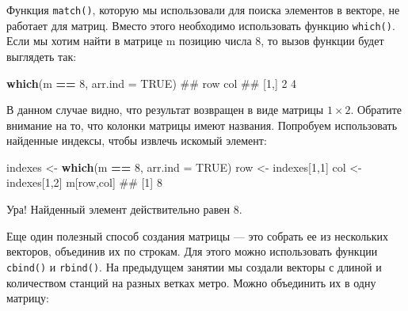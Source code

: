 \documentclass[]{book}
\newenvironment{Shaded}{\begin{snugshade}}{\end{snugshade}}
\newcommand{\KeywordTok}[1]{\textcolor[rgb]{0.13,0.29,0.53}{\textbf{#1}}}
\newcommand{\DataTypeTok}[1]{\textcolor[rgb]{0.13,0.29,0.53}{#1}}
\newcommand{\DecValTok}[1]{\textcolor[rgb]{0.00,0.00,0.81}{#1}}
\newcommand{\StringTok}[1]{\textcolor[rgb]{0.31,0.60,0.02}{#1}}
\newcommand{\OtherTok}[1]{\textcolor[rgb]{0.56,0.35,0.01}{#1}}
\newcommand{\OperatorTok}[1]{\textcolor[rgb]{0.81,0.36,0.00}{\textbf{#1}}}
\newcommand{\NormalTok}[1]{#1}
\begin{document}
Функция \texttt{match()}, которую мы использовали для поиска элементов в
векторе, не работает для матриц. Вместо этого необходимо использовать
функцию \texttt{which()}. Если мы хотим найти в матрице m позицию числа
\(8\), то вызов функции будет выглядеть так:

\begin{Shaded}
\begin{Highlighting}[]
\KeywordTok{which}\NormalTok{(m }\OperatorTok{==}\StringTok{ }\DecValTok{8}\NormalTok{, }\DataTypeTok{arr.ind =} \OtherTok{TRUE}\NormalTok{)}
\NormalTok{##      row col}
\NormalTok{## [1,]   2   4}
\end{Highlighting}
\end{Shaded}

В данном случае видно, что результат возвращен в виде матрицы
\(1 \times 2\). Обратите внимание на то, что колонки матрицы имеют
названия. Попробуем использовать найденные индексы, чтобы извлечь
искомый элемент:

\begin{Shaded}
\begin{Highlighting}[]
\NormalTok{indexes <-}\StringTok{ }\KeywordTok{which}\NormalTok{(m }\OperatorTok{==}\StringTok{ }\DecValTok{8}\NormalTok{, }\DataTypeTok{arr.ind =} \OtherTok{TRUE}\NormalTok{)}
\NormalTok{row <-}\StringTok{ }\NormalTok{indexes[}\DecValTok{1}\NormalTok{,}\DecValTok{1}\NormalTok{]}
\NormalTok{col <-}\StringTok{ }\NormalTok{indexes[}\DecValTok{1}\NormalTok{,}\DecValTok{2}\NormalTok{]}
\NormalTok{m[row,col]}
\NormalTok{## [1] 8}
\end{Highlighting}
\end{Shaded}

Ура! Найденный элемент действительно равен \(8\).

Еще один полезный способ создания матрицы --- это собрать ее из
нескольких векторов, объединив их по строкам. Для этого можно
использовать функции \texttt{cbind()} и \texttt{rbind()}. На предыдущем
занятии мы создали векторы с длиной и количеством станций на разных
ветках метро. Можно объединить их в одну матрицу:
\end{document}
